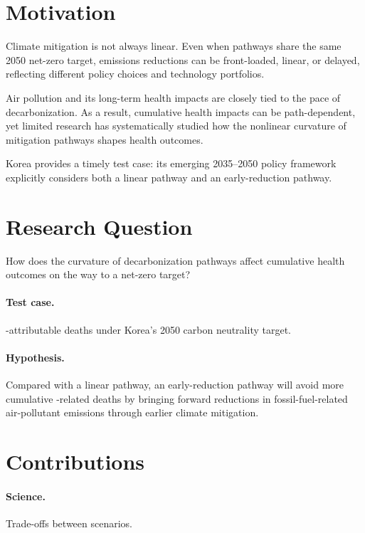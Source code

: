
\section{Motivation}\label{sec:motivation}

Climate mitigation is not always linear. Even when pathways share the same
2050 net-zero target, emissions reductions can be front-loaded, linear, or
delayed, reflecting different policy choices and technology portfolios.

Air pollution and its long-term health impacts are closely tied to the pace of
decarbonization. As a result, cumulative health impacts can be path-dependent,
yet limited research has systematically studied how the nonlinear curvature of
mitigation pathways shapes health outcomes.

Korea provides a timely test case: its emerging 2035--2050 policy framework
explicitly considers both a linear pathway and an early-reduction pathway.

\section{Research Question}\label{sec:rq}

How does the curvature of decarbonization pathways affect cumulative health
outcomes on the way to a net-zero target?

\paragraph{Test case.} \PM-attributable deaths under Korea's 2050 carbon
neutrality target.

\paragraph{Hypothesis.} Compared with a linear pathway, an early-reduction
pathway will avoid more cumulative \PM-related deaths by bringing forward
reductions in fossil-fuel-related air-pollutant emissions through earlier
climate mitigation.

\section{Contributions}\label{sec:contributions}

\paragraph{Science.} Trade-offs between scenarios. 

